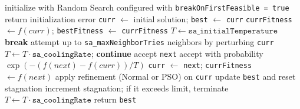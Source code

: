 \begin{algorithm}[H]
\caption{Simulated Annealing}
\begin{algorithmic}[1]
\State initialize with Random Search configured with \texttt{breakOnFirstFeasible = true}
	\State return initialization error
\EndIf
\State \texttt{curr} $\gets$ initial solution; \texttt{best} $\gets$ \texttt{curr}
\State \texttt{currFitness} $\gets f(curr)$; \texttt{bestFitness} $\gets$ \texttt{currFitness}
\State $T \gets \texttt{sa\_initialTemperature}$
	 \State \textbf{break} \EndIf
	\State attempt up to \texttt{sa\_maxNeighborTries} neighbors by perturbing \texttt{curr}
		\State $T \gets T \cdot \texttt{sa\_coolingRate}$; \textbf{continue}
	\EndIf
		\State accept \texttt{next}
	\Else
		\State accept with probability $\exp(-(f(next)-f(curr))/T)$
	\EndIf
		\State \texttt{curr} $\gets$ \texttt{next}; \texttt{currFitness} $\gets f(next)$
		\State apply refinement (Normal or PSO) on \texttt{curr}
			\State update \texttt{best} and reset stagnation
		\Else
			\State increment stagnation; if it exceeds limit, terminate
		\EndIf
	\EndIf
	\State $T \gets T \cdot \texttt{sa\_coolingRate}$
\EndFor
\State return \texttt{best}
\end{algorithmic}
\end{algorithm}